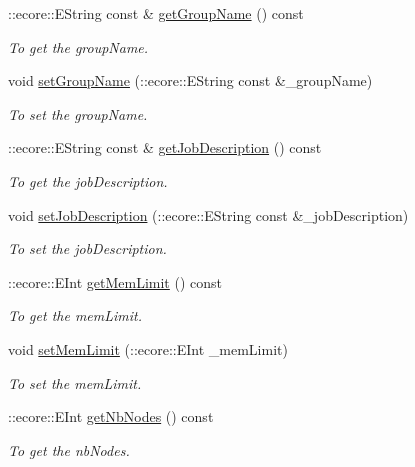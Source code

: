 \begin{DoxyCompactItemize}
::ecore::EString const \& \hyperlink{classTMS__Data_1_1Job_a648e34b094d759f52285945c03754662}{getGroupName} () const 
\begin{DoxyCompactList}\small\item\em To get the groupName. \item\end{DoxyCompactList}\item 
void \hyperlink{classTMS__Data_1_1Job_a99a6f325b47f21ce00831ba8da022e24}{setGroupName} (::ecore::EString const \&\_\-groupName)
\begin{DoxyCompactList}\small\item\em To set the groupName. \item\end{DoxyCompactList}\item 
::ecore::EString const \& \hyperlink{classTMS__Data_1_1Job_a1b471909565373b38dd9f500e4982191}{getJobDescription} () const 
\begin{DoxyCompactList}\small\item\em To get the jobDescription. \item\end{DoxyCompactList}\item 
void \hyperlink{classTMS__Data_1_1Job_aa3e53ad74b7ecfa510c7c9b9184b6dc6}{setJobDescription} (::ecore::EString const \&\_\-jobDescription)
\begin{DoxyCompactList}\small\item\em To set the jobDescription. \item\end{DoxyCompactList}\item 
::ecore::EInt \hyperlink{classTMS__Data_1_1Job_a389eea578f865d07eaf18acc073d4e1b}{getMemLimit} () const 
\begin{DoxyCompactList}\small\item\em To get the memLimit. \item\end{DoxyCompactList}\item 
void \hyperlink{classTMS__Data_1_1Job_a7664fee3b76a14fe04c3a9e5d9003624}{setMemLimit} (::ecore::EInt \_\-memLimit)
\begin{DoxyCompactList}\small\item\em To set the memLimit. \item\end{DoxyCompactList}\item 
::ecore::EInt \hyperlink{classTMS__Data_1_1Job_a2d72f80183aaf94f861912eff68585df}{getNbNodes} () const 
\begin{DoxyCompactList}\small\item\em To get the nbNodes. \item\end{DoxyCompactList}\item 

\end{DoxyCompactItemize}
